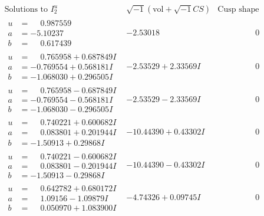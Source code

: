 \documentclass[1p]{elsarticle_modified}
\theoremstyle{definition}
\newcommand{\I}{\sqrt{-1}}
\begin{document}
$$\begin{array}{c|c|c}  
\text{Solutions to }I^u_{2}& \I (\text{vol} + \sqrt{-1}CS) & \text{Cusp shape}\\
 \hline 
\begin{aligned}
u &= \phantom{-}0.987559\phantom{ +0.000000I} \\
a &= -5.10237\phantom{ +0.000000I} \\
b &= \phantom{-}0.617439\phantom{ +0.000000I}\end{aligned}
 & -2.53018\phantom{ +0.000000I} & \phantom{-0.000000 } 0 \\ \hline\begin{aligned}
u &= \phantom{-}0.765958 + 0.687849 I \\
a &= -0.769554 + 0.568181 I \\
b &= -1.068030 + 0.296505 I\end{aligned}
 & -2.53529 + 2.33569 I & \phantom{-0.000000 } 0 \\ \hline\begin{aligned}
u &= \phantom{-}0.765958 - 0.687849 I \\
a &= -0.769554 - 0.568181 I \\
b &= -1.068030 - 0.296505 I\end{aligned}
 & -2.53529 - 2.33569 I & \phantom{-0.000000 } 0 \\ \hline\begin{aligned}
u &= \phantom{-}0.740221 + 0.600682 I \\
a &= \phantom{-}0.083801 + 0.201944 I \\
b &= -1.50913 + 0.29868 I\end{aligned}
 & -10.44390 + 0.43302 I & \phantom{-0.000000 } 0 \\ \hline\begin{aligned}
u &= \phantom{-}0.740221 - 0.600682 I \\
a &= \phantom{-}0.083801 - 0.201944 I \\
b &= -1.50913 - 0.29868 I\end{aligned}
 & -10.44390 - 0.43302 I & \phantom{-0.000000 } 0 \\ \hline\begin{aligned}
u &= \phantom{-}0.642782 + 0.680172 I \\
a &= \phantom{-}1.09156 - 1.09879 I \\
b &= \phantom{-}0.050970 + 1.083900 I\end{aligned}
 & -4.74326 + 0.09745 I & \phantom{-0.000000 } 0 \\ \hline\begin{aligned}

\end{aligned}
\end{array}$$
\end{document}
